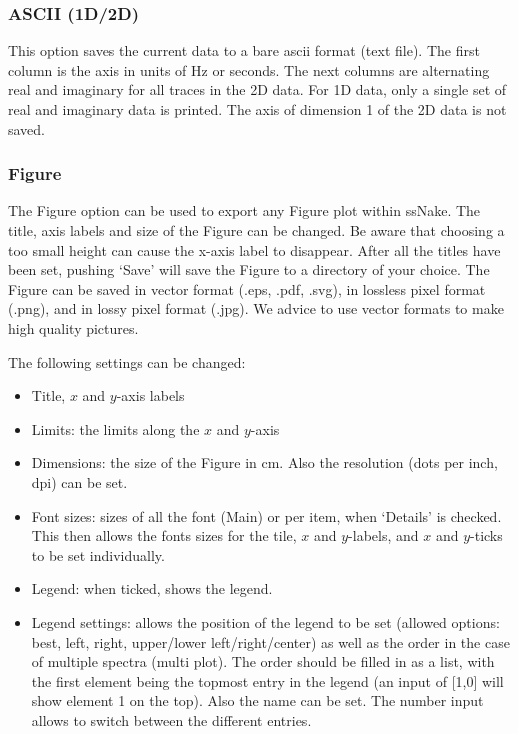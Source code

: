 \documentclass[11pt,a4paper]{article}
\begin{document}
\subsubsection*{ASCII (1D/2D)}
This option saves the current data to a bare ascii format (text file). The first column is the axis in units of Hz or seconds. The next columns are alternating real and imaginary for all traces in the 2D data. For 1D data, only a single set of real and imaginary data is printed. The axis of dimension 1 of the 2D data is not saved.

\subsubsection*{Figure}
The Figure option can be used to export any Figure plot within ssNake. The title, axis labels and size of the
Figure can be changed. Be aware that choosing a too small height can cause the x-axis label to disappear.
After all the titles have been set, pushing `Save' will save the Figure to a directory of your choice. The
Figure can be saved in vector format (.eps, .pdf, .svg), in lossless pixel format (.png), and in lossy pixel
format (.jpg). We advice to use vector formats to make high quality pictures.

The following settings can be changed:
\begin{itemize}
  \item Title, $x$ and $y$-axis labels
  \item Limits: the limits along the $x$ and $y$-axis
  \item Dimensions: the size of the Figure in cm. Also the resolution (dots per inch, dpi) can be set.
  \item Font sizes: sizes of all the font (Main) or per item, when `Details' is checked. This then allows the
	 fonts sizes for the tile, $x$ and $y$-labels, and $x$ and $y$-ticks to be set individually.
  \item Legend: when ticked, shows the legend.
  \item Legend settings: allows the position of the legend to be set (allowed options: best, left, right, upper/lower
	 left/right/center) as well as the order in the case of
	 multiple spectra (multi plot). The order should be filled in as a list, with the first element being the
	 topmost entry in the legend (an input of [1,0] will show element 1 on the top). Also the name can be set.
	 The number input allows to switch between the different entries.
\end{itemize}
\end{document}
